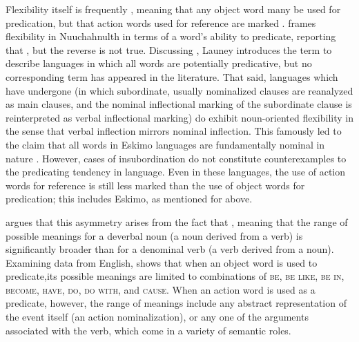 Flexibility itself is frequently , meaning that any object word many be used for predication, but that action words used for reference are marked . \textcite[44]{Nakayama2003} frames flexibility in Nuuchahnulth in terms of a word's ability to predicate, reporting that , but the reverse is not true. Discussing , Launey \parencites*{Launey1994}{Launey2004} introduces the term  to describe languages in which all words are potentially predicative, but no corresponding term  has appeared in the literature. That said, languages which have undergone  (in which subordinate, usually nominalized clauses are reanalyzed as main clauses, and the nominal inflectional marking of the subordinate clause is reinterpreted as verbal inflectional marking)  do exhibit noun-oriented flexibility in the sense that verbal inflection mirrors nominal inflection. This famously led to the claim that all words in Eskimo languages are fundamentally nominal in nature . However, cases of insubordination do not constitute counterexamples to the predicating tendency in language. Even in these languages, the use of action words for reference is still less marked than the use of object words for predication; this includes Eskimo, as mentioned for  above.

\textcite{Kastovsky1996} argues that this asymmetry arises from the fact that , meaning that the range of possible meanings for a deverbal noun (a noun derived from a verb) is significantly broader than for a denominal verb (a verb derived from a noun). Examining data from English, \citeauthor{Kastovsky1996} shows that when an object word is used to predicate,its possible meanings are limited to combinations of \textsc{be}, \textsc{be like}, \textsc{be in}, \textsc{become}, \textsc{have}, \textsc{do}, \textsc{do with}, and \textsc{cause}. When an action word is used as a predicate, however, the range of meanings include any abstract representation of the event itself (an action nominalization), or any one of the arguments associated with the verb, which come in a variety of semantic roles.

